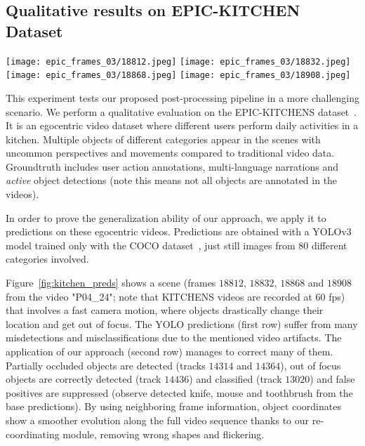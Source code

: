 \documentclass[letterpaper, 10 pt, conference]{ieeeconf}
\begin{document}
\subsection{Qualitative results on EPIC-KITCHEN Dataset}

\begin{figure*}[!htb]
    \centering
    \texttt{[image: epic\_frames\_03/18812.jpeg]}
    \texttt{[image: epic\_frames\_03/18832.jpeg]}
    \texttt{[image: epic\_frames\_03/18868.jpeg]}
    \texttt{[image: epic\_frames\_03/18908.jpeg]}
  
\caption{
    Object detection on EPIC-KITCHENS data using a YOLOv3 model (top row) and improvements obtained applying our post-processing (bottom row). Predicted bounding boxes are shown along with their track\_id when our post-processing is applied. To see more varied results these four frames are not consecutive ($18812$, $18832$, $18868$ and $18908$), watch the supplementary video for results on the whole  sequence\protect\footnotemark. 
    Low-scoring detections have been removed for a better visualization
    }
    \label{fig:kitchen_preds}
\end{figure*}

This experiment tests our proposed post-processing pipeline in a more challenging scenario. We perform a qualitative evaluation on the EPIC-KITCHENS dataset~\cite{damen2018scaling}. It is an egocentric video dataset where different users perform daily activities in a kitchen. 
Multiple objects of different categories appear in the scenes with uncommon perspectives and movements compared to traditional video data. Groundtruth includes user action annotations, multi-language narrations and \textit{active} object detections (note this means not all objects are annotated in the videos). 


In order to prove the generalization ability of our approach, we apply it to predictions on these egocentric videos. 
Predictions are obtained with a YOLOv3 model trained only with the COCO dataset~\cite{COCO:ECCV}, just still images from 80 different categories involved.



Figure~\ref{fig:kitchen_preds} shows a scene (frames $18812$, $18832$, $18868$ and $18908$ from the video "P04\_24"; note that KITCHENS videos are recorded at 60 fps) that involves a fast camera motion, where objects drastically change their location and get out of focus. The YOLO predictions (first row) suffer from many misdetections and misclassifications due to the mentioned video artifacts. The application of our approach (second row) manages to correct many of them. Partially occluded objects are detected (tracks $14314$ and $14364$), out of focus objects are correctly detected (track $14436$) and classified (track $13020$) and false positives are suppressed (observe detected knife, mouse and toothbrush from the base predictions). By using neighboring frame information, object coordinates show a smoother evolution along the full video sequence thanks to our re-coordinating module, removing wrong shapes and flickering.
\end{document}
